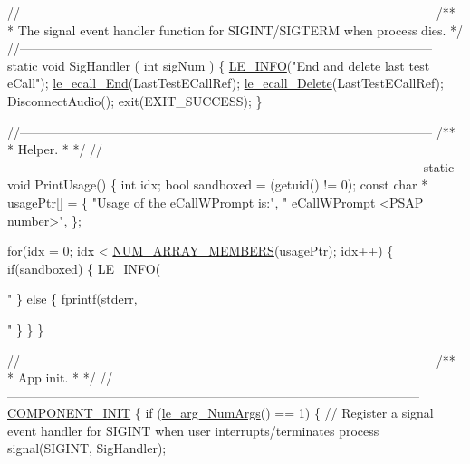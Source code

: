 \begin{DoxyCodeInclude}
{{{{{{{{\textcolor{comment}{//--------------------------------------------------------------------------------------------------}\textcolor{comment}{}
\textcolor{comment}{/**}
\textcolor{comment}{ * The signal event handler function for SIGINT/SIGTERM when process dies.}
\textcolor{comment}{ */}
\textcolor{comment}{//--------------------------------------------------------------------------------------------------}
\textcolor{keyword}{static} \textcolor{keywordtype}{void} SigHandler
(
    \textcolor{keywordtype}{int} sigNum
)
\{
    \hyperlink{le__log_8h_a23e6d206faa64f612045d688cdde5808}{LE\_INFO}(\textcolor{stringliteral}{"End and delete last test eCall"});
    \hyperlink{le__ecall__interface_8h_a85800c86f9709fb7baa7219cc762181c}{le\_ecall\_End}(LastTestECallRef);
    \hyperlink{le__ecall__interface_8h_af1221deb68c46912748f65505b3e4919}{le\_ecall\_Delete}(LastTestECallRef);
    DisconnectAudio();
    exit(EXIT\_SUCCESS);
\}

\textcolor{comment}{//--------------------------------------------------------------------------------------------------}\textcolor{comment}{}
\textcolor{comment}{/**}
\textcolor{comment}{ * Helper.}
\textcolor{comment}{ *}
\textcolor{comment}{ */}
\textcolor{comment}{//--------------------------------------------------------------------------------------------------}
\textcolor{keyword}{static} \textcolor{keywordtype}{void} PrintUsage()
\{
    \textcolor{keywordtype}{int} idx;
    \textcolor{keywordtype}{bool} sandboxed = (getuid() != 0);
    \textcolor{keyword}{const} \textcolor{keywordtype}{char} * usagePtr[] = \{
            \textcolor{stringliteral}{"Usage of the eCallWPrompt is:"},
            \textcolor{stringliteral}{"   eCallWPrompt <PSAP number>"},
    \};

    \textcolor{keywordflow}{for}(idx = 0; idx < \hyperlink{le__basics_8h_a8d8f28a045f43b477cafb67a99894c07}{NUM\_ARRAY\_MEMBERS}(usagePtr); idx++)
    \{
        \textcolor{keywordflow}{if}(sandboxed)
        \{
            \hyperlink{le__log_8h_a23e6d206faa64f612045d688cdde5808}{LE\_INFO}(\textcolor{stringliteral}{"%
        \}
        \textcolor{keywordflow}{else}
        \{
            fprintf(stderr, \textcolor{stringliteral}{"%
        \}
    \}
\}

\textcolor{comment}{//--------------------------------------------------------------------------------------------------}\textcolor{comment}{}
\textcolor{comment}{/**}
\textcolor{comment}{ * App init.}
\textcolor{comment}{ *}
\textcolor{comment}{ */}
\textcolor{comment}{//--------------------------------------------------------------------------------------------------}
\hyperlink{le__event_loop_8h_abdb9187a56836a93d19cc793cbd4b7ec}{COMPONENT\_INIT}
\{
    \textcolor{keywordflow}{if} (\hyperlink{le__args_8h_a6fbbeb423104e6eb92fe47ef42b7310a}{le\_arg\_NumArgs}() == 1)
    \{
        \textcolor{comment}{// Register a signal event handler for SIGINT when user interrupts/terminates process}
        signal(SIGINT, SigHandler);

}}}}}}}}}}
\end{DoxyCodeInclude}
